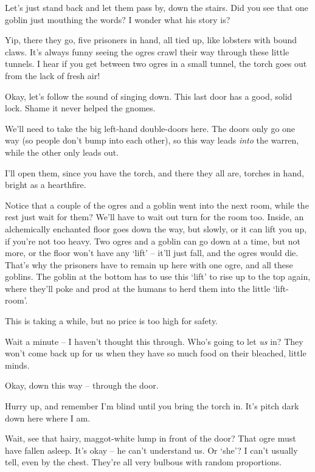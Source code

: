 \begin{multicols}{2}
\begin{exampletext}
Let's just stand back and let them pass by, down the stairs.
Did you see that one goblin just mouthing the words?
I wonder what his story is?

Yip, there they go, five prisoners in hand, all tied up, like lobsters with bound claws.
It's always funny seeing the ogres crawl their way through these little tunnels.
I hear if you get between two ogres in a small tunnel, the torch goes out from the lack of fresh air!

Okay, let's follow the sound of singing down.
This last door has a good, solid lock.
Shame it never helped the gnomes.

We'll need to take the big left-hand double-doors here.
The doors only go one way (so people don't bump into each other), so this way leads \emph{into} the warren, while the other only leads out.

I'll open them, since you have the torch, and there they all are, torches in hand, bright as a hearthfire.

Notice that a couple of the ogres and a goblin went into the next room, while the rest just wait for them?
We'll have to wait out turn for the room too.
Inside, an alchemically enchanted floor goes down the way, but slowly, or it can lift you up, if you're not too heavy.
Two ogres and a goblin can go down at a time, but not more, or the floor won't have any `lift' -- it'll just fall, and the ogres would die.
That's why the prisoners have to remain up here with one ogre, and all these goblins.
The goblin at the bottom has to use this `lift' to rise up to the top again, where they'll poke and prod at the humans to herd them into the little `lift-room'.

This is taking a while, but no price is too high for safety.


Wait a minute -- I haven't thought this through.
Who's going to let \emph{us} in?
They won't come back up for us when they have so much food on their bleached, little minds.

Okay, down this way -- through the door.

Hurry up, and remember I'm blind until you bring the torch in.
It's pitch dark down here where I am.

Wait, see that hairy, maggot-white lump in front of the door?
That ogre must have fallen asleep.
It's okay -- he can't understand us.
Or `she'?
I can't usually tell, even by the chest.
They're all very bulbous with random proportions.


\end{exampletext}
\end{multicols}
